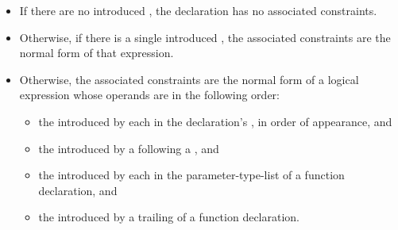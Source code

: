 \begin{itemize}
\item If there are no introduced ,
the declaration has no associated constraints.

\item Otherwise, if there is a single introduced ,
the associated constraints are the normal form
of that expression.

\item Otherwise, the associated constraints are the normal form of a logical
 expression whose operands are in the
following order:
\begin{itemize}
\item
the  introduced by
each  in
the declaration's ,
in order of appearance, and

\item
the  introduced by
a  following
a , and

\item
the  introduced by
each  in
the parameter-type-list of a function declaration, and

\item
the  introduced by
a trailing  of
a function declaration.
\end{itemize}
\end{itemize}

